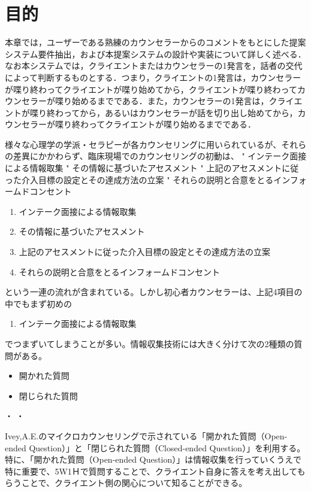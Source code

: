 \documentclass[shuuron]{kuee}
\begin{document}
\section{目的}

本章では，ユーザーである熟練のカウンセラーからのコメントをもとにした提案システム要件抽出，および本提案システムの設計や実装について詳しく述べる．なお本システムでは，クライエントまたはカウンセラーの1発言を，話者の交代によって判断するものとする．つまり，クライエントの1発言は，カウンセラーが喋り終わってクライエントが喋り始めてから，クライエントが喋り終わってカウンセラーが喋り始めるまでである．また，カウンセラーの1発言は，クライエントが喋り終わってから，あるいはカウンセラーが話を切り出し始めてから，カウンセラーが喋り終わってクライエントが喋り始めるまでである．



様々な心理学の学派・セラピーが各カウンセリングに用いられているが、それらの差異にかかわらず、臨床現場でのカウンセリングの初動は、
"	インテーク面接による情報取集
"	その情報に基づいたアセスメント
"	上記のアセスメントに従った介入目標の設定とその達成方法の立案
"	それらの説明と合意をとるインフォームドコンセント
\begin{enumerate}
 \item インテーク面接による情報取集
 \item その情報に基づいたアセスメント
 \item 上記のアセスメントに従った介入目標の設定とその達成方法の立案
 \item それらの説明と合意をとるインフォームドコンセント
\end{enumerate}
という一連の流れが含まれている。しかし初心者カウンセラーは、上記4項目の中でもまず初めの
\begin{enumerate}
 \item インテーク面接による情報取集
\end{enumerate}
でつまずいてしまうことが多い。情報収集技術には大きく分けて次の2種類の質問がある。
\begin{itemize}
\item 開かれた質問
\item 閉じられた質問
\end{itemize}
・
・


Ivey,A.E.\cite{ivey}のマイクロカウンセリングで示されている「開かれた質問（Open-ended Question）」と「閉じられた質問（Closed-ended Question）」を利用する。特に、「開かれた質問（Open-ended Question）」は情報収集を行っていくうえで特に重要で、5W1Ｈで質問することで、クライエント自身に答えを考え出してもらうことで、クライエント側の関心について知ることができる。　　　　　　　　　　　　　　　　　　　　　　　　　　　　　　　　　　　　　　　　　　　　　　　　　　　　　　　　　　　　　　　　　　　　　　　　　　　　
\end{document}
